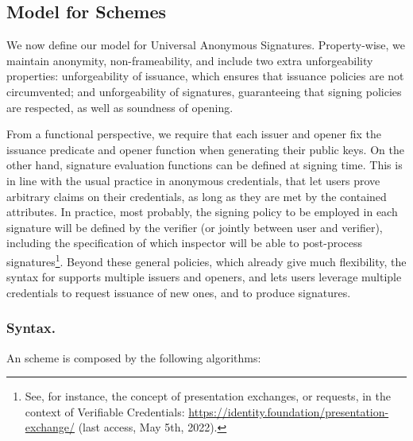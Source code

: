 \subsection{Model for \UAS Schemes}
\label{ssec:model-uas}

We now define our model for Universal Anonymous Signatures. Property-wise, we
maintain anonymity, non-frameability, and include two extra unforgeability
properties: unforgeability of issuance, which ensures that issuance policies
are not circumvented; and unforgeability of signatures, guaranteeing that
signing policies are respected, as well as soundness of opening.

From a functional perspective, we require that each issuer and opener fix
the issuance predicate \fissue and opener function \finsp when generating
their public keys. On the other hand, signature evaluation functions \feval can
be defined at signing time. This is in line with the usual practice in anonymous
credentials, that let
users prove arbitrary claims on their credentials, as long as they are met by
the contained attributes. In practice, most probably, the signing policy to be
employed in each signature will be defined by the verifier (or jointly between
user and verifier), including the specification of which inspector will be
able to post-process signatures\footnote{See, for instance, the concept of
  presentation exchanges, or requests, in the context of Verifiable Credentials:
  \url{https://identity.foundation/presentation-exchange/} (last access, May
  5th, 2022).}. Beyond these general policies, which already give much
flexibility, the syntax for \UAS supports multiple issuers and openers, and
lets users leverage multiple credentials to request issuance of new ones, and
to produce signatures.

\subsubsection{Syntax.} An \UAS scheme is composed by the following algorithms:

